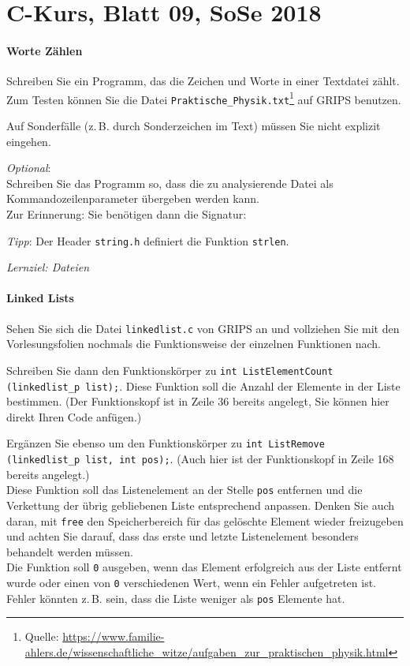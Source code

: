 \documentclass[
	ngerman,
	fontsize=10pt,
	parskip=half,
	titlepage=true,
	DIV=12
]{scrartcl}
\begin{document}
\part*{C-Kurs, Blatt 09, SoSe 2018}


\subsection*{Worte Zählen}
Schreiben Sie ein Programm, das die Zeichen  und Worte in einer Textdatei zählt. Zum Testen können Sie die Datei \texttt{Praktische\_Physik.txt}\footnote{Quelle: \url{https://www.familie-ahlers.de/wissenschaftliche_witze/aufgaben_zur_praktischen_physik.html}} auf GRIPS benutzen.

Auf Sonderfälle (z.\,B. durch Sonderzeichen im Text) müssen Sie nicht explizit eingehen.

\emph{Optional}:\\
Schreiben Sie das Programm so, dass die zu analysierende Datei als Kommandozeilenparameter übergeben werden kann.\\
Zur Erinnerung: Sie benötigen dann die Signatur:

\emph{Tipp}: 
Der Header \texttt{string.h} definiert die Funktion \texttt{strlen}.

\emph{Lernziel: Dateien}


\subsection*{Linked Lists}
Sehen Sie sich die Datei \texttt{linkedlist.c} von GRIPS an und vollziehen Sie mit den Vorlesungsfolien nochmals die Funktionsweise der einzelnen Funktionen nach.

Schreiben Sie dann den Funktionskörper zu \texttt{int ListElementCount (linkedlist_p list);}. Diese Funktion soll die Anzahl der Elemente in der Liste bestimmen. (Der Funktionskopf ist in Zeile 36 bereits angelegt, Sie können hier direkt Ihren Code anfügen.)

Ergänzen Sie ebenso um den Funktionskörper zu \texttt{int ListRemove (linkedlist_p list, int pos);}. (Auch hier ist der Funktionskopf in Zeile 168 bereits angelegt.)\\
Diese Funktion soll das Listenelement an der Stelle \texttt{pos} entfernen und die Verkettung der übrig gebliebenen Liste entsprechend anpassen. Denken Sie auch daran, mit \texttt{free} den Speicherbereich für das gelöschte Element wieder freizugeben und achten Sie darauf, dass das erste und letzte Listenelement besonders behandelt werden müssen.\\
Die Funktion soll \texttt{0} ausgeben, wenn das Element erfolgreich aus der Liste entfernt wurde oder einen von \texttt{0} verschiedenen Wert, wenn ein Fehler aufgetreten ist. Fehler könnten z.\,B. sein, dass die Liste weniger als \texttt{pos} Elemente hat.
\end{document}
